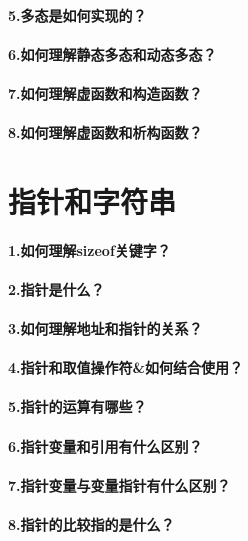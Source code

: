 \documentclass[UTF8,a4paper,8pt]{ctexart}
\begin{document}
	 \paragraph{5.多态是如何实现的？}
	 \paragraph{6.如何理解静态多态和动态多态？}
	 \paragraph{7.如何理解虚函数和构造函数？}
	 \paragraph{8.如何理解虚函数和析构函数？}

\section*{指针和字符串}
	 \paragraph{1.如何理解sizeof关键字？} 
	 \paragraph{2.指针是什么？}
	 \paragraph{3.如何理解地址和指针的关系？}
	 \paragraph{4.指针和取值操作符\&如何结合使用？}
	 \paragraph{5.指针的运算有哪些？}
	 \paragraph{6.指针变量和引用有什么区别？}
	 \paragraph{7.指针变量与变量指针有什么区别？}
	 \paragraph{8.指针的比较指的是什么？}
\end{document}
